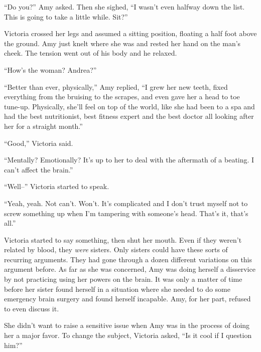``Do you?'' Amy asked.  Then she sighed, ``I wasn't even halfway down the list.  This is going to take a little while.  Sit?''



Victoria crossed her legs and assumed a sitting position, floating a half foot above the ground.  Amy just knelt where she was and rested her hand on the man's cheek.  The tension went out of his body and he relaxed.



``How's the woman?  Andrea?''



``Better than ever, physically,'' Amy replied, ``I grew her new teeth, fixed everything from the bruising to the scrapes, and even gave her a head to toe tune-up.  Physically, she'll feel on top of the world, like she had been to a spa and had the best nutritionist, best fitness expert and the best doctor all looking after her for a straight month.''



``Good,'' Victoria said.



``Mentally?  Emotionally?  It's up to her to deal with the aftermath of a beating.  I can't affect the brain.''



``Well--'' Victoria started to speak.



``Yeah, yeah.  Not can't.  Won't.  It's complicated and I don't trust myself not to screw something up when I'm tampering with someone's head.  That's it, that's all.''



Victoria started to say something, then shut her mouth.  Even if they weren't related by blood, they \emph{were} sisters.  Only sisters could have these sorts of recurring arguments.  They had gone through a dozen different variations on this argument before.  As far as she was concerned, Amy was doing herself a disservice by not practicing using her powers on the brain.  It was only a matter of time before her sister found herself in a situation where she needed to do some emergency brain surgery and found herself incapable.  Amy, for her part, refused to even discuss it.



She didn't want to raise a sensitive issue when Amy was in the process of doing her a major favor.  To change the subject, Victoria asked, ``Is it cool if I question him?''



